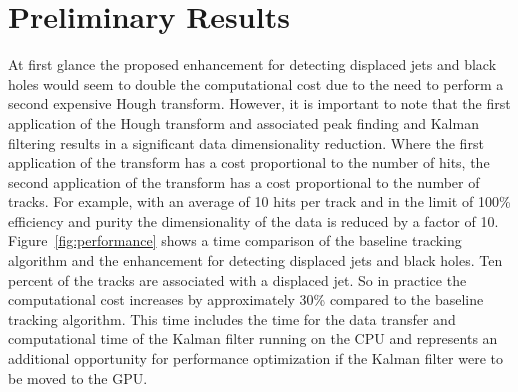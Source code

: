 \documentclass{JINST}
\begin{document}
\section{Preliminary Results}

At first glance the proposed enhancement for detecting displaced jets and black holes would seem to double the computational cost due to the need to perform a second expensive Hough transform.  However, it is important to note that the first application of the Hough transform and associated peak finding and Kalman filtering results in a significant data dimensionality reduction.  Where the first application of the transform has a cost proportional to the number of hits, the second application of the transform has a cost proportional to the number of tracks.  For example, with an average of 10 hits per track and in the limit of 100\% efficiency and purity the dimensionality of the data is reduced by a factor of 10.  Figure~\ref{fig:performance} shows a time comparison of the baseline tracking algorithm and the enhancement for detecting displaced jets and black holes.  Ten percent of the tracks are associated with a displaced jet.  So in practice the computational cost increases by approximately 30\% compared to the baseline tracking algorithm.  This time includes the time for the data transfer and computational time of the Kalman filter running on the CPU and represents an additional opportunity for performance optimization if the Kalman filter were to be moved to the GPU.
\end{document}
